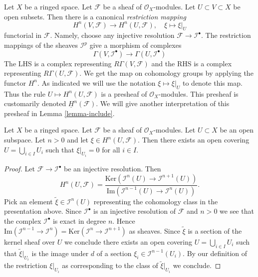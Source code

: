 \noindent
Let $X$ be a ringed space.
Let $\mathcal{F}$ be a sheaf of $\mathcal{O}_X$-modules.
Let $U \subset V \subset X$ be open subsets.
Then there is a canonical {\it restriction mapping}
\begin{equation}
\label{equation-restriction-mapping}
H^n(V, \mathcal{F})
\longrightarrow
H^n(U, \mathcal{F}), \quad
\xi \longmapsto \xi|_U
\end{equation}
functorial in $\mathcal{F}$. Namely, choose any injective
resolution $\mathcal{F} \to \mathcal{I}^\bullet$. The restriction
mappings of the sheaves $\mathcal{I}^p$ give a morphism of complexes
$$
\Gamma(V, \mathcal{I}^\bullet)
\longrightarrow
\Gamma(U, \mathcal{I}^\bullet)
$$
The LHS is a complex representing $R\Gamma(V, \mathcal{F})$
and the RHS is a complex representing $R\Gamma(U, \mathcal{F})$.
We get the map on cohomology groups by applying the functor $H^n$.
As indicated we will use the notation $\xi \mapsto \xi|_U$ to denote this map.
Thus the rule $U \mapsto H^n(U, \mathcal{F})$ is a presheaf of
$\mathcal{O}_X$-modules. This presheaf is customarily denoted
$\underline{H}^n(\mathcal{F})$. We will give another interpretation
of this presheaf in Lemma \ref{lemma-include}.

\begin{lemma}
\label{lemma-kill-cohomology-class-on-covering}
Let $X$ be a ringed space.
Let $\mathcal{F}$ be a sheaf of $\mathcal{O}_X$-modules.
Let $U \subset X$ be an open subspace.
Let $n > 0$ and let $\xi \in H^n(U, \mathcal{F})$.
Then there exists an open covering
$U = \bigcup_{i\in I} U_i$ such that $\xi|_{U_i} = 0$ for
all $i \in I$.
\end{lemma}

\begin{proof}
Let $\mathcal{F} \to \mathcal{I}^\bullet$ be an injective resolution.
Then
$$
H^n(U, \mathcal{F}) =
\frac{\text{Ker}(\mathcal{I}^n(U) \to \mathcal{I}^{n + 1}(U))}
{\text{Im}(\mathcal{I}^{n - 1}(U) \to \mathcal{I}^n(U))}.
$$
Pick an element $\tilde \xi \in \mathcal{I}^n(U)$ representing the
cohomology class in the presentation above. Since $\mathcal{I}^\bullet$
is an injective resolution of $\mathcal{F}$ and $n > 0$ we see that
the complex $\mathcal{I}^\bullet$ is exact in degree $n$. Hence
$\text{Im}(\mathcal{I}^{n - 1} \to \mathcal{I}^n) =
\text{Ker}(\mathcal{I}^n \to \mathcal{I}^{n + 1})$ as sheaves.
Since $\tilde \xi$ is a section of the kernel sheaf over $U$
we conclude there exists an open covering $U = \bigcup_{i \in I} U_i$
such that $\tilde \xi|_{U_i}$ is the image under $d$ of a section
$\xi_i \in \mathcal{I}^{n - 1}(U_i)$. By our definition of the
restriction $\xi|_{U_i}$ as corresponding to the class of
$\tilde \xi|_{U_i}$ we conclude.
\end{proof}

